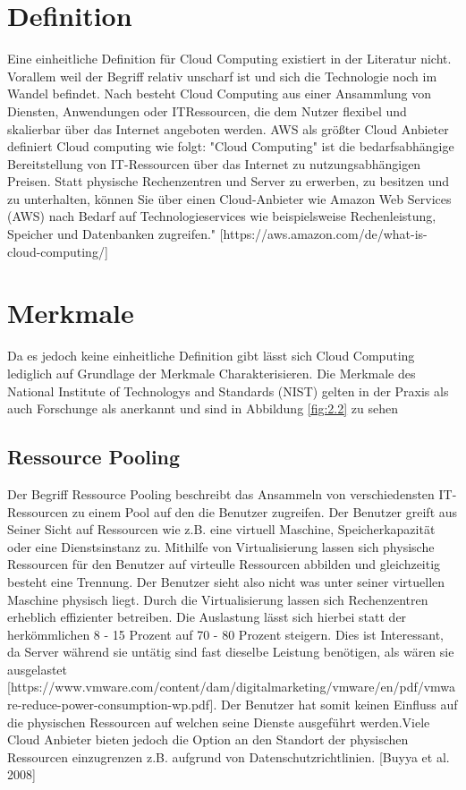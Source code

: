 \section{Definition}
Eine einheitliche Definition  für Cloud Computing existiert in der Literatur nicht. Vorallem weil der Begriff relativ unscharf ist und sich die Technologie noch im Wandel befindet. Nach besteht Cloud Computing aus einer Ansammlung von Diensten, Anwendungen oder ITRessourcen, die dem Nutzer flexibel und skalierbar über das Internet angeboten werden. AWS als größter Cloud Anbieter definiert Cloud computing wie folgt: "Cloud Computing" ist die bedarfsabhängige Bereitstellung von IT-Ressourcen über das Internet zu nutzungsabhängigen Preisen. Statt physische Rechenzentren und Server zu erwerben, zu besitzen und zu unterhalten, können Sie über einen Cloud-Anbieter wie Amazon Web Services (AWS) nach Bedarf auf Technologieservices wie beispielsweise Rechenleistung, Speicher und Datenbanken zugreifen." [https://aws.amazon.com/de/what-is-cloud-computing/] 

\section{Merkmale}
Da es jedoch keine einheitliche Definition gibt lässt sich Cloud Computing lediglich auf Grundlage der Merkmale Charakterisieren. Die Merkmale des National Institute of Technologys and Standards (NIST) gelten in der Praxis als auch Forschunge als anerkannt und sind in Abbildung \ref{fig:2.2} zu sehen
\subsection{Ressource Pooling}
Der Begriff Ressource Pooling beschreibt das Ansammeln von verschiedensten IT-Ressourcen zu einem Pool auf den die Benutzer zugreifen. Der Benutzer greift aus Seiner Sicht auf Ressourcen wie z.B. eine virtuell Maschine, Speicherkapazität oder eine Dienstsinstanz zu. Mithilfe von Virtualisierung lassen sich physische Ressourcen für den Benutzer auf virteulle Ressourcen abbilden und gleichzeitig besteht eine Trennung. Der Benutzer sieht also nicht was unter seiner virtuellen Maschine physisch liegt. Durch die Virtualisierung lassen sich Rechenzentren erheblich effizienter betreiben. Die Auslastung lässt sich hierbei statt der herkömmlichen 8 - 15 Prozent auf 70 - 80 Prozent steigern. Dies ist Interessant, da Server während sie untätig sind fast dieselbe Leistung benötigen, als wären sie ausgelastet [https://www.vmware.com/content/dam/digitalmarketing/vmware/en/pdf/vmware-reduce-power-consumption-wp.pdf]. Der Benutzer hat somit keinen Einfluss auf die physischen Ressourcen auf welchen seine Dienste ausgeführt werden.Viele Cloud Anbieter bieten jedoch die Option an den Standort der physischen Ressourcen einzugrenzen z.B. aufgrund von Datenschutzrichtlinien.  [Buyya et al. 2008]
